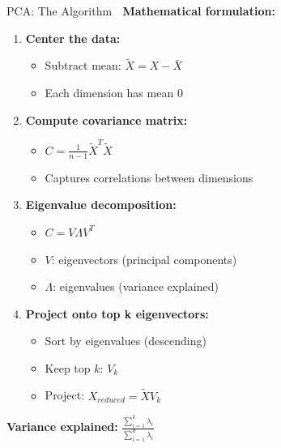 \documentclass[aspectratio=169]{beamer}
\begin{document}
\begin{frame}[shrink=10]{PCA: The Algorithm 🔧}
\textbf{Mathematical formulation:}

\vspace{1em}

\begin{enumerate}\setlength{\itemsep}{0pt}
    \item \textbf{Center the data:}
    \begin{itemize}\setlength{\itemsep}{0pt}
        \item Subtract mean: $\tilde{X} = X - \bar{X}$
        \item Each dimension has mean 0
    \end{itemize}

    \item \textbf{Compute covariance matrix:}
    \begin{itemize}\setlength{\itemsep}{0pt}
        \item $C = \frac{1}{n-1} \tilde{X}^T \tilde{X}$
        \item Captures correlations between dimensions
    \end{itemize}

    \item \textbf{Eigenvalue decomposition:}
    \begin{itemize}\setlength{\itemsep}{0pt}
        \item $C = V \Lambda V^T$
        \item $V$: eigenvectors (principal components)
        \item $\Lambda$: eigenvalues (variance explained)
    \end{itemize}

    \item \textbf{Project onto top k eigenvectors:}
    \begin{itemize}\setlength{\itemsep}{0pt}
        \item Sort by eigenvalues (descending)
        \item Keep top $k$: $V_k$
        \item Project: $X_{reduced} = \tilde{X} V_k$
    \end{itemize}
\end{enumerate}

\vspace{1em}

\textbf{Variance explained:} $\frac{\sum_{i=1}^k \lambda_i}{\sum_{i=1}^d \lambda_i}$
\end{frame}
\end{document}
